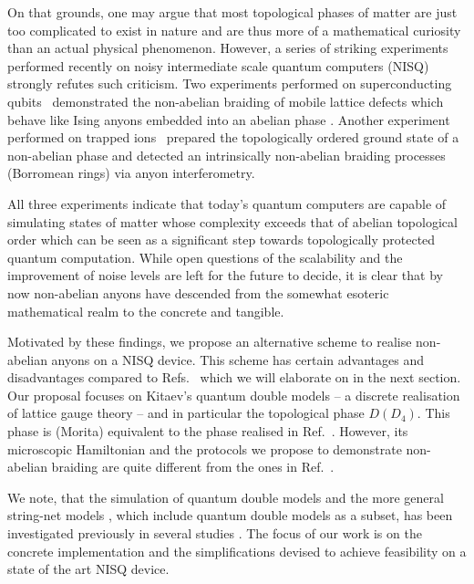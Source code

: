\documentclass[a4paper,twocolumn,11pt, accepted=2024-06-14]{quantumarticle}
\begin{document}
On that grounds, one may argue that most topological phases of matter are just too complicated to exist in nature and are thus more of a mathematical curiosity than an actual physical phenomenon. However, a series of striking experiments~\cite{iqbal2023creation,xu,andersen2022observation} performed recently on noisy intermediate scale quantum computers (NISQ) strongly refutes such  criticism. Two experiments performed on superconducting qubits~\cite{xu,andersen2022observation} demonstrated the non-abelian braiding of mobile lattice defects which behave like Ising anyons embedded into an abelian phase \cite{Bombin2010,Lensky2023}. Another experiment performed on trapped ions~\cite{iqbal2023creation} prepared the topologically ordered ground state of a non-abelian phase and detected an intrinsically non-abelian braiding processes (Borromean rings) via anyon interferometry. 


All three experiments indicate that today's quantum computers are capable of simulating states of matter whose complexity exceeds that of abelian topological order which can be seen as a significant step towards topologically protected quantum computation. While open questions of the scalability and the improvement of noise levels are left for the future to decide, it is clear that by now non-abelian anyons have descended from the somewhat esoteric mathematical realm to the concrete and tangible.

Motivated by these findings, we propose an alternative scheme to realise non-abelian anyons on a NISQ device. This scheme has certain advantages and disadvantages compared to Refs.~\cite{iqbal2023creation,xu,andersen2022observation} which we will elaborate on in the next section. Our proposal focuses on Kitaev's quantum double models -- a discrete realisation of lattice gauge theory -- and in particular the topological phase $D(D_4)$. This phase is (Morita) equivalent to the phase realised in Ref.~\cite{iqbal2023creation}. However, its microscopic Hamiltonian and the protocols we propose to demonstrate non-abelian braiding are quite different from the ones in Ref.~\cite{iqbal2023creation}. 

We note, that the simulation of quantum double models and the more general string-net models \cite{Levin_2005}, which include quantum double models as a subset, has been investigated previously in several studies \cite{Cirac,2009Brennen,PRXQuantum.3.040315,goel2023unveiling}. The focus of our work is on the concrete implementation and the simplifications devised to achieve feasibility on a state of the art NISQ device.
\end{document}
